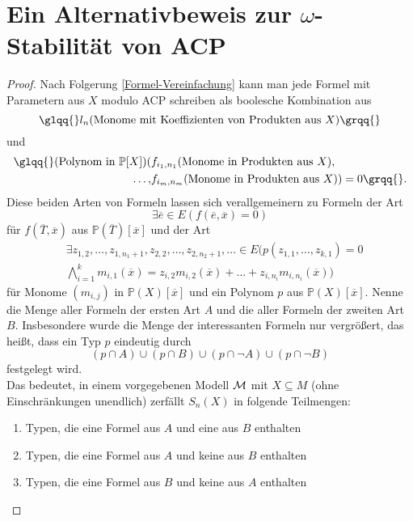 \renewcommand\thesection{\Alph{section}}
\section{Ein Alternativbeweis zur $\omega$-Stabilität von ACP}

\begin{proof}
	Nach Folgerung \ref{Formel-Vereinfachung} kann man jede Formel mit Parametern aus $X$ modulo ACP schreiben als boolesche Kombination aus $$\glqq{}l_n(\text{Monome mit Koeffizienten von Produkten aus }X)\grqq{}$$ und
	\begin{align*}
	\text{\glqq{}}(\text{Polynom in }\mathbb{P}[X])(&f_{i_1,n_1}(\text{Monome in Produkten aus }X),\\\dots,&f_{i_m,n_m}(\text{Monome in Produkten aus }X))=0\grqq{}.
	\end{align*}
	Diese beiden Arten von Formeln lassen sich verallgemeinern
    zu Formeln der Art $${\exists\overline{e}\in E(f(\overline{e},\overline{x})=0)}$$ für  $f(\overline{T},\overline{x})$ aus $\mathbb{P}(\overline{T})[\overline{x}]$ und der Art
	\begin{align*}
	&\exists z_{1,2},\dots,z_{1,n_1+1},z_{2,2},\dots,z_{2,n_2+1},\dots\in E(p(z_{1,1},\dots,z_{k,1})=0\\
	&\bigwedge\limits_{i=1}^km_{i,1}(\overline{x})=z_{i,2}m_{i,2}(\overline{x})+\dots+z_{i,n_i}m_{i,n_i}(\overline{x}))
	\end{align*}
	für Monome $(m_{i,j})$ in $\mathbb{P}(X)[\overline{x}]$ und ein Polynom $p$ aus $\mathbb{P}(X)[\overline{x}]$. Nenne die Menge aller Formeln der ersten Art $A$ und die aller Formeln der zweiten Art $B$. Insbesondere wurde die Menge der \glqq{}interessanten\grqq{} Formeln nur vergrößert, das heißt, dass ein Typ $p$ eindeutig durch $$(p\cap A)\cup(p\cap B)\cup(p\cap\neg A)\cup(p\cap\neg B)$$ festgelegt wird.\\
	Das bedeutet, in einem vorgegebenen Modell $\mathcal{M}$ mit $X\subseteq M$ (ohne Einschränkungen unendlich) zerfällt $S_n(X)$ in folgende Teilmengen:\\
	\begin{enumerate}
		\item Typen, die eine Formel aus $A$ und eine aus $B$ enthalten
		\item Typen, die eine Formel aus $A$ und keine aus $B$ enthalten
		\item Typen, die eine Formel aus $B$ und keine aus $A$ enthalten

\end{enumerate}
\end{proof}
